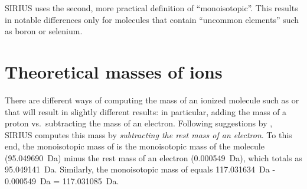 \documentclass[letterpaper,10pt,openany,oneside]{sphinxmanual}
\begin{document}
SIRIUS uses the second, more practical definition of ``monoisotopic''.  This
results in notable differences only for molecules that contain ``uncommon
elements'' such as boron or selenium.


\section{Theoretical masses of ions}

There are different ways of computing the mass of an ionized molecule such as
 or  that will result in slightly different results: in
particular, adding the mass of a proton vs.\ subtracting the mass of an
electron.  Following suggestions by \citet{ferrer07importance}, SIRIUS
computes this mass by \emph{subtracting the rest mass of an electron}.  To
this end, the monoisotopic mass of  is the monoisotopic mass of
the molecule  (95.049690~Da) minus the rest mass of an electron
(0.000549~Da), which totals as 95.049141~Da.  Similarly, the monoisotopic
mass of  equals 117.031634~Da - 0.000549~Da = 117.031085~Da.
\end{document}
